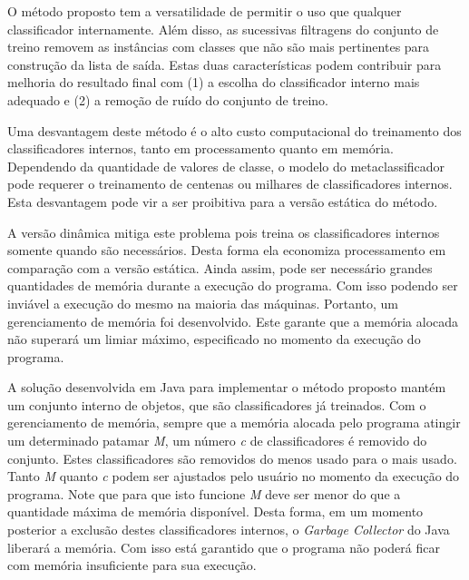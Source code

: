 O método proposto tem a versatilidade de permitir o uso que qualquer classificador internamente. Além disso, as sucessivas filtragens do conjunto de treino removem as instâncias com classes que não são mais pertinentes para construção da lista de saída. Estas duas características podem contribuir para melhoria do resultado final com (1) a escolha do classificador interno mais adequado e (2) a remoção de ruído do conjunto de treino.

Uma desvantagem deste método é o alto custo computacional do treinamento dos classificadores internos, tanto em processamento quanto em memória. Dependendo da quantidade de valores de classe, o modelo do metaclassificador pode requerer o treinamento de centenas ou milhares de classificadores internos. Esta desvantagem pode vir a ser proibitiva para a versão estática do método. 

A versão dinâmica mitiga este problema pois treina os classificadores internos somente quando são necessários. Desta forma ela economiza processamento em comparação com a versão estática. Ainda assim, pode ser necessário grandes quantidades de memória durante a execução do programa. Com isso podendo ser inviável a execução do mesmo na maioria das máquinas. Portanto, um gerenciamento de memória foi desenvolvido. Este garante que a memória alocada não superará um limiar máximo, especificado no momento da execução do programa.

A solução desenvolvida em Java para implementar o método proposto mantém um conjunto interno de objetos, que são classificadores já treinados. Com o gerenciamento de memória, sempre que a memória alocada pelo programa atingir um determinado patamar \textit{M}, um número \textit{c} de classificadores é removido do conjunto. Estes classificadores são removidos do menos usado para o mais usado. Tanto \textit{M} quanto \textit{c} podem ser ajustados pelo usuário no momento da execução do programa. Note que para que isto funcione \textit{M} deve ser menor do que a quantidade máxima de memória disponível. Desta forma, em um momento posterior a exclusão destes classificadores internos, o \textit{Garbage Collector} do Java liberará a memória. Com isso está garantido que o programa não poderá ficar com memória insuficiente para sua execução.
